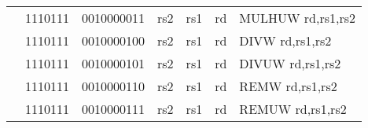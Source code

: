 \begin{table}[p]
\begin{small}
\begin{center}
\begin{tabular}{rcccccccccl}
&
\multicolumn{1}{|c|}{1110111} &
\multicolumn{5}{c|}{0010000011} &
\multicolumn{1}{c|}{rs2} &
\multicolumn{1}{c|}{rs1} &
\multicolumn{1}{c|}{rd} & MULHUW rd,rs1,rs2 \\
\cline{2-10}
  

&
\multicolumn{1}{|c|}{1110111} &
\multicolumn{5}{c|}{0010000100} &
\multicolumn{1}{c|}{rs2} &
\multicolumn{1}{c|}{rs1} &
\multicolumn{1}{c|}{rd} & DIVW rd,rs1,rs2 \\
\cline{2-10}
  

&
\multicolumn{1}{|c|}{1110111} &
\multicolumn{5}{c|}{0010000101} &
\multicolumn{1}{c|}{rs2} &
\multicolumn{1}{c|}{rs1} &
\multicolumn{1}{c|}{rd} & DIVUW rd,rs1,rs2 \\
\cline{2-10}
  

&
\multicolumn{1}{|c|}{1110111} &
\multicolumn{5}{c|}{0010000110} &
\multicolumn{1}{c|}{rs2} &
\multicolumn{1}{c|}{rs1} &
\multicolumn{1}{c|}{rd} & REMW rd,rs1,rs2 \\
\cline{2-10}
  

&
\multicolumn{1}{|c|}{1110111} &
\multicolumn{5}{c|}{0010000111} &
\multicolumn{1}{c|}{rs2} &
\multicolumn{1}{c|}{rs1} &
\multicolumn{1}{c|}{rd} & REMUW rd,rs1,rs2 \\
\cline{2-10}
  

\end{tabular}
\end{center}
\end{small}

\label{instr-table}
\end{table}
  

\newpage

